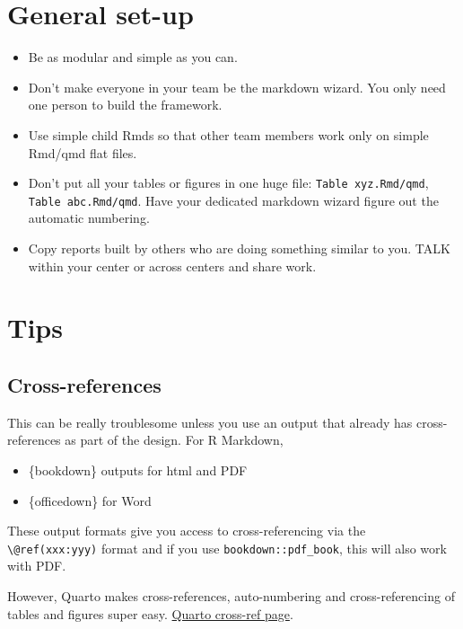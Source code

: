\documentclass[
  letterpaper,
  oneside]{scrbook}
\providecommand{\tightlist}{%
  \setlength{\itemsep}{0pt}\setlength{\parskip}{0pt}}\usepackage{longtable,booktabs,array}
\begin{document}
\hypertarget{general-set-up}{%
\section{General set-up}\label{general-set-up}}

\begin{itemize}
\item
  Be as modular and simple as you can.
\item
  Don't make everyone in your team be the markdown wizard. You only need
  one person to build the framework.
\item
  Use simple child Rmds so that other team members work only on simple
  Rmd/qmd flat files.
\item
  Don't put all your tables or figures in one huge file:
  \texttt{Table\ xyz.Rmd/qmd}, \texttt{Table\ abc.Rmd/qmd}. Have your
  dedicated markdown wizard figure out the automatic numbering.
\item
  Copy reports built by others who are doing something similar to you.
  TALK within your center or across centers and share work.
\end{itemize}

\hypertarget{tips-1}{%
\section{Tips}\label{tips-1}}

\hypertarget{cross-references}{%
\subsection{Cross-references}\label{cross-references}}

This can be really troublesome unless you use an output that already has
cross-references as part of the design. For R Markdown,

\begin{itemize}
\tightlist
\item
  \{bookdown\} outputs for html and PDF
\item
  \{officedown\} for Word
\end{itemize}

These output formats give you access to cross-referencing via the
\texttt{\textbackslash{}@ref(xxx:yyy)} format and if you use
\texttt{bookdown::pdf\_book}, this will also work with PDF.

However, Quarto makes cross-references, auto-numbering and
cross-referencing of tables and figures super easy.
\href{https://quarto.org/docs/authoring/cross-references.html}{Quarto
cross-ref page}.
\end{document}
